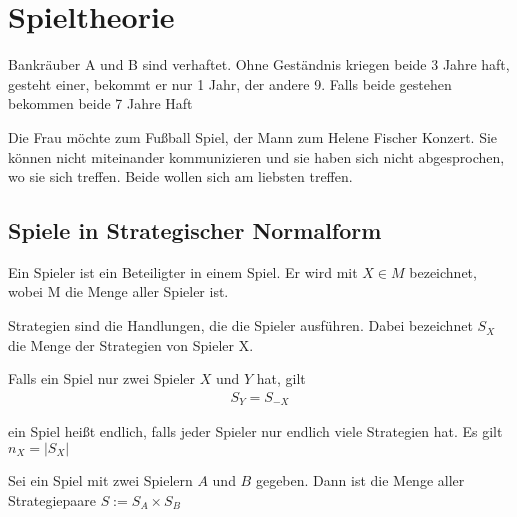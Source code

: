 
\chapter{Spieltheorie}
\label{chap:spieltheorie}

\begin{bsp}[Gefangenendilemma]
	Bankräuber A und B sind verhaftet. Ohne Geständnis kriegen beide 3 Jahre haft, gesteht einer, bekommt er nur 1 Jahr, der andere 9. Falls beide gestehen bekommen beide 7 Jahre Haft
\end{bsp}

\begin{bsp}[Geschlechterkampf]
	Die Frau möchte zum Fußball Spiel, der Mann zum Helene Fischer Konzert. Sie können nicht miteinander kommunizieren und sie haben sich nicht abgesprochen, wo sie sich treffen. Beide wollen sich am liebsten treffen. 
\end{bsp}

\section{Spiele in Strategischer Normalform}

\begin{defi}[Spieler]
	Ein Spieler ist ein Beteiligter in einem Spiel. Er wird mit $X \in M$ bezeichnet, wobei M die Menge aller Spieler ist.  
\end{defi}

\begin{defi}[Strategie]
	Strategien sind die Handlungen, die die Spieler ausführen. Dabei bezeichnet $S_X$ die Menge der Strategien von Spieler X. 
\end{defi}


\begin{thm}
	Falls ein Spiel nur zwei Spieler $X$ und $Y$ hat, gilt 
	\begin{align*}
		S_Y=S_{-X}
	\end{align*}
\end{thm}

\begin{defi}
	ein Spiel heißt endlich, falls jeder Spieler nur endlich viele Strategien hat. Es gilt $n_X=|S_X|$ 
\end{defi}

\begin{defi}
	Sei ein Spiel mit zwei Spielern $A$ und $B$ gegeben. Dann ist die Menge aller Strategiepaare $S:=S_A \times S_B$  
\end{defi}


